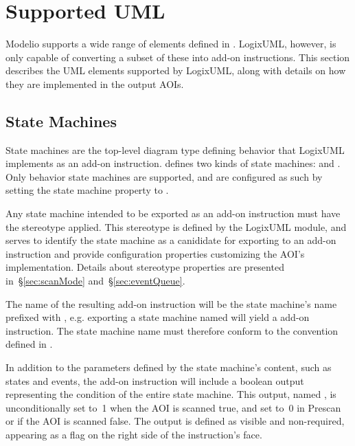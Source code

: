 \section{Supported UML}

Modelio supports a wide range of elements defined in \textcite{OMGUML}.
LogixUML, however, is only capable of converting a subset of these into
add-on instructions. This section describes the UML elements supported
by LogixUML, along with details on how they are implemented in the output
AOIs.

\subsection{State Machines}

State machines are the top-level diagram type defining behavior
that LogixUML implements as an add-on instruction. \textcite[\S14]{OMGUML}
defines two kinds of state machines: 
and . Only behavior state machines are
supported, and are configured as such by setting the state machine
 property to .

Any state machine intended to be exported as an add-on instruction
must have the  stereotype applied.
This stereotype is defined by the LogixUML module, and serves to
identify the state machine as a canididate for exporting to an add-on
instruction and provide configuration properties customizing the
AOI's implementation. Details about stereotype properties are presented
in~\S\ref{sec:scanMode} and~\S\ref{sec:eventQueue}.

The name of the resulting add-on instruction will be the state machine's
name prefixed with , e.g. exporting a state
machine named  will yield a
 add-on instruction.
The state machine name must therefore conform to the convention defined
in \textcite[Chapter~2]{AOI}.

In addition to the parameters defined by the state machine's content,
such as states and events, the add-on instruction will include a
boolean output representing the condition of the entire state machine.
This output, named , is unconditionally set to~1 when
the AOI is scanned true, and set to~0 in Prescan or if the AOI
is scanned false. The  output is defined as visible
and non-required, appearing as a flag on the right side of the
instruction's face.

